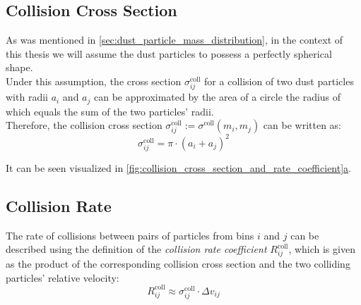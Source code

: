 
    \subsection{Collision Cross Section}
        
        As was mentioned in \cref{sec:dust_particle_mass_distribution}, in the context of 
        this thesis we will assume the dust particles to possess a perfectly spherical shape. \\

        Under this assumption, the cross section $\sigma^\text{coll}_{ij}$ for a collision of two
        dust particles with radii $a_i$ and $a_j$ can be approximated by the area of a circle the 
        radius of which equals the sum of the two particles' radii. \\

        Therefore, the collision cross section 
        $\sigma^\text{coll}_{ij} := \sigma^\text{coll}(m_i, m_j)$ 
        can be written as:
        \begin{equation}
            \sigma^\text{coll}_{ij} = \pi \cdot (a_i+a_j)^2
        \end{equation}

        It can be seen visualized in 
        \hyperref[fig:collision_cross_section_and_rate_coefficient]
        {\cref*{fig:collision_cross_section_and_rate_coefficient}a}.

        

    \clearpage\subsection{Collision Rate}

        The rate of collisions between pairs of particles from bins $i$ and $j$ can be 
        described using the definition of the \textit{collision rate coefficient} 
        $R^\text{coll}_{ij}$, which is given as the product of the corresponding collision 
        cross section and the two colliding particles' relative velocity: 
        \begin{equation}
            R^\text{coll}_{ij} \approx \sigma^\text{coll}_{ij} \cdot \Delta v_{ij}
        \end{equation}


